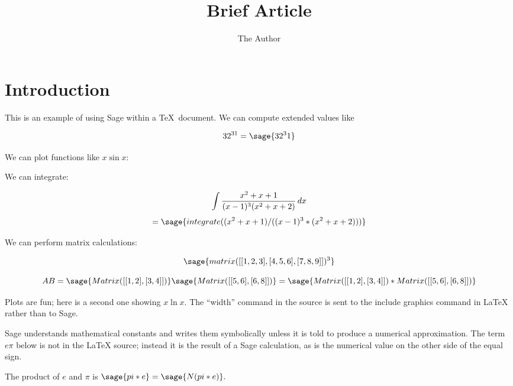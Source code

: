 \documentclass[11pt, oneside]{amsart}
\title{Brief Article}
\author{The Author}
\begin{document}
\maketitle
\section{Introduction}

This is an example of using Sage within a \TeX\ document. We can compute extended values like 

	$$32^{31} = \sage{32^31}$$
	
We can plot functions like $x \sin x$:

 
 We can integrate:
 
 $$\int {{x^2 + x + 1} \over {(x - 1)^3 (x^2 + x + 2)}}\,dx$$ $$=  \sage{integrate( (x^2 + x + 1) / ((x - 1)^3 * (x^2 + x + 2)) )}$$
 
 \newpage
 We can perform matrix calculations:
 
$$\sage{matrix([[1, 2, 3], [4, 5, 6], [7, 8, 9]])^3}$$

$$AB=  \sage{Matrix([[1, 2], [3, 4]])} \sage{Matrix([[5, 6], [6, 8]])} = \sage{Matrix([[1, 2], [3, 4]]) * Matrix([[5, 6], [6, 8]])}$$

Plots are fun; here is a second one showing $x \ln x$. The ``width'' command in the source is sent to the include graphics command in LaTeX rather than to Sage.


Sage understands mathematical constants and writes them symbolically unless it is told to produce a numerical approximation. The term $e \pi$ below is not in the LaTeX source; instead it is the result of a Sage calculation, as is the numerical value on the other side of the equal sign.

The product of $e$ and $\pi$ is $\sage{pi * e} = \sage{N(pi * e)}.$
\end{document}
